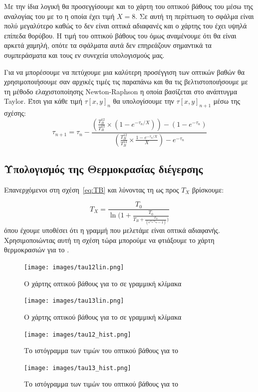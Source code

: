 \documentclass[a4paper,12pt]{memoir}
\begin{document}
Με την ίδια λογική θα προσεγγίσουμε και το χάρτη του οπτικού βάθους του  μέσω της αναλογίας του με το  η οποία έχει τιμή $X=8$. Σε αυτή τη περίπτωση το σφάλμα είναι πολύ μεγαλύτερο καθώς το  δεν είναι οπτικά αδιαφανές και ο χάρτης του  έχει υψηλά επίπεδα θορύβου. Η τιμή του οπτικού βάθους του  όμως αναμένουμε ότι θα είναι αρκετά χαμηλή, οπότε τα σφάλματα αυτά δεν επηρεάζουν σημαντικά τα συμπεράσματα και τους εν συνεχεία υπολογισμούς μας.

Για να μπορέσουμε να πετύχουμε μια καλύτερη προσέγγιση των οπτικών βαθών θα χρησιμοποιήσουμε σαν αρχικές τιμές τις παραπάνω και θα τις βελτιστοποιήσουμε με τη μέθοδο ελαχιστοποίησης Newton-Raphson η οποία βασίζεται στο ανάπτυγμα Taylor. Έτσι για κάθε τιμή $\tau[x,y] _n$ θα υπολογίσουμε την $\tau[x,y] _{n+1}$ μέσω της σχέσης:
\begin{equation}
\tau _{n+1} = \tau _n -\frac{\left( \frac{T_B ^{12}}{T_B ^{13}} \times (1-e^{-\tau _n/X}) \right)-(1-e^{-\tau _n} ) } {\left( \frac{T_B ^{12}}{T_B ^{13}} \times \frac{1-e^{-\tau _n /X}}{X} \right) -e^{-\tau _n}}
\end{equation}

\subsection{Υπολογισμός της Θερμοκρασίας διέγερσης}
Επανερχόμενοι στη σχέση~\ref{eq:TB} και λύνοντας τη ως προς $T_X$ βρίσκουμε:

\begin{equation}
T_X=\frac{T_0}{\ln (1+\frac{T_0}{T_B+\frac{T_0}{( e^{T_0/T_{bg}}-1)})}}
\end{equation}
όπου έχουμε υποθέσει ότι η γραμμή που μελετάμε είναι οπτικά αδιαφανής. Χρησιμοποιώντας αυτή τη σχέση τώρα μπορούμε να φτιάξουμε το χάρτη θερμοκρασιών για το . 

\pagebreak

\begin{figure}[h!]
\centering
	\texttt{[image: images/tau12lin.png]}
	\caption{Ο χάρτης οπτικού βάθους για το  σε γραμμική κλίμακα}

\centering
	\texttt{[image: images/tau13lin.png]}
	\caption{Ο χάρτης οπτικού βάθους για το  σε γραμμική κλίμακα}
\end{figure}

\begin{figure}[h!]
	\centering
	\texttt{[image: images/tau12\_hist.png]}
	\caption{Το ιστόγραμμα των τιμών του οπτικού βάθους για το }
	
	
	\centering
	\texttt{[image: images/tau13\_hist.png]}
	\caption{Το ιστόγραμμα των τιμών του οπτικού βάθους για το }
\end{figure}
\end{document}
